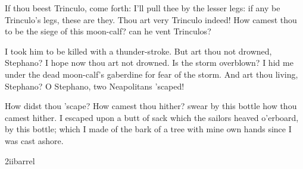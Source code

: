 \begin{prose_speech}[Stephano] 
If thou beest Trinculo, come forth: I'll pull thee by the lesser legs: if any be Trinculo's legs, these are they. Thou art very Trinculo indeed! How camest thou to be the siege of this moon-calf? can he vent Trinculos?
\end{prose_speech}

\begin{prose_speech}[Trinculo] 
I took him to be killed with a thunder-stroke. But art thou not drowned, Stephano? I hope now thou art not drowned. Is the storm overblown? I hid me under the dead moon-calf's gaberdine for fear of the storm. And art thou living, Stephano? O Stephano, two Neapolitans 'scaped!
\end{prose_speech}


\begin{prose_speech}[Caliban] 
\end{prose_speech}

\begin{prose_speech}[Stephano] 
How didst thou 'scape? How camest thou hither? swear by this bottle how thou camest hither. I escaped upon a butt of sack which the sailors heaved o'erboard, by this bottle; which I made of the bark of a tree with mine own hands since I was cast ashore.
\end{prose_speech}

\begin{pictures} %
	
\begin{bwbigpic}
	[\picwidth]
	{2iibarrel}
	{}
\end{bwbigpic}

\end{pictures}





